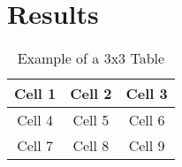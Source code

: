 \chapter{Results\label{results}}

\begin{table}[h]

\begin{tabular}{|c|c|c|}
\hline
Cell 1 & Cell 2 & Cell 3 \\ \hline
Cell 4 & Cell 5 & Cell 6 \\ \hline
Cell 7 & Cell 8 & Cell 9 \\ \hline
\end{tabular}
\caption{Example of a 3x3 Table}
\label{table:example3x3}
\end{table}